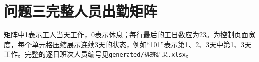 \section{问题三完整人员出勤矩阵}

矩阵中1表示工人当天工作，0表示休息；每行最后的工日数应为23。为控制页面宽度，每个单元格压缩展示连续3天的状态，例如“101”表示第1、2、3天中第1、3天工作。完整的逐日班次人员编号见\texttt{generated/排班结果.xlsx}。

\scriptsize

\normalsize
